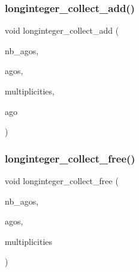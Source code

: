 \subsubsection{\texorpdfstring{longinteger\+\_\+collect\+\_\+add()}{longinteger\_collect\_add()}}
{\footnotesize\ttfamily void longinteger\+\_\+collect\+\_\+add (\begin{DoxyParamCaption}\item[{\mbox{\hyperlink{galois_8h_a09fddde158a3a20bd2dcadb609de11dc}{I\+NT}} \&}]{nb\+\_\+agos,  }\item[{\mbox{\hyperlink{classlonginteger__object}{longinteger\+\_\+object}} $\ast$\&}]{agos,  }\item[{\mbox{\hyperlink{galois_8h_a09fddde158a3a20bd2dcadb609de11dc}{I\+NT}} $\ast$\&}]{multiplicities,  }\item[{\mbox{\hyperlink{classlonginteger__object}{longinteger\+\_\+object}} \&}]{ago }\end{DoxyParamCaption})}

\mbox{\label{longinteger__domain_8_c_abd87ca5c5c3cb4f6e2c50ae5ad86b40b}} 
\subsubsection{\texorpdfstring{longinteger\+\_\+collect\+\_\+free()}{longinteger\_collect\_free()}}
{\footnotesize\ttfamily void longinteger\+\_\+collect\+\_\+free (\begin{DoxyParamCaption}\item[{\mbox{\hyperlink{galois_8h_a09fddde158a3a20bd2dcadb609de11dc}{I\+NT}} \&}]{nb\+\_\+agos,  }\item[{\mbox{\hyperlink{classlonginteger__object}{longinteger\+\_\+object}} $\ast$\&}]{agos,  }\item[{\mbox{\hyperlink{galois_8h_a09fddde158a3a20bd2dcadb609de11dc}{I\+NT}} $\ast$\&}]{multiplicities }\end{DoxyParamCaption})}

\mbox{\label{longinteger__domain_8_c_ab055dba67992bb4d67cc93e9749532c2}} 
